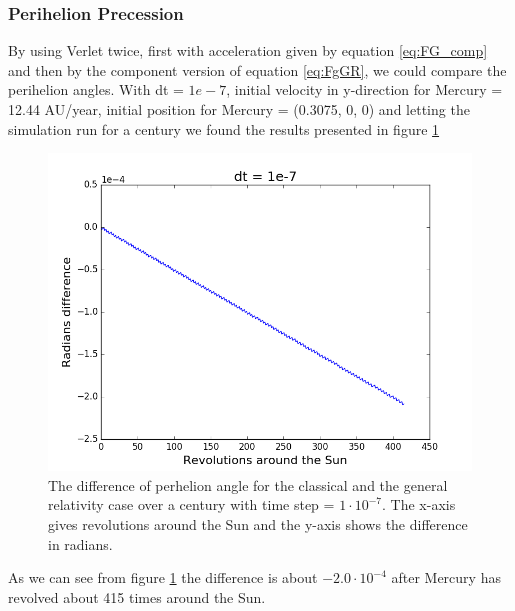 \documentclass{article}
\newcommand{\E}[1]{\cdot 10^{#1}}
\begin{document}
\subsubsection*{Perihelion Precession}
By using Verlet twice, first with acceleration given by equation \eqref{eq:FG_comp} and then by the component version of equation \eqref{eq:FgGR}, we could compare the perihelion angles. With dt = $1e-7$, initial velocity in y-direction for Mercury = 12.44 AU/year, initial position for Mercury = (0.3075, 0, 0) and letting the simulation run for a century we found the results presented in figure \ref{fig:perhelion}
\begin{figure}[H]
\centering
\includegraphics[scale=0.4]{../figures/perheliondt1e-7.png}
\caption{The difference of perhelion angle for the classical and the general relativity case over a century with time step = $1\E{-7}$. The x-axis gives revolutions around the Sun and the y-axis shows the difference in radians.}
\label{fig:perhelion}
\end{figure}
As we can see from figure \ref{fig:perhelion} the difference is about $-2.0 \E{-4}$ after Mercury has revolved about 415 times around the Sun. 
\end{document}
